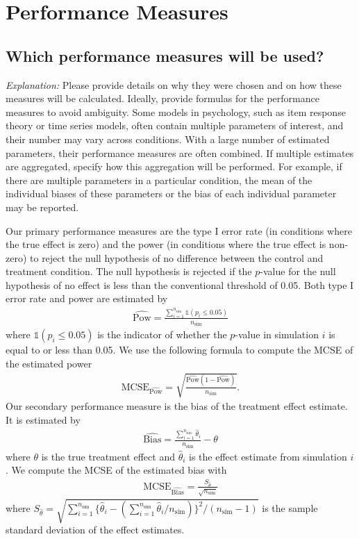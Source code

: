 \documentclass[12pt]{article}
\begin{document}
\section{Performance Measures}
\subsection{Which performance measures will be used?}    
\textit{Explanation:} Please provide details on why they were chosen and on how these measures will be calculated. Ideally, provide formulas for the performance measures to avoid ambiguity. Some models in psychology, such as item response theory or time series models, often contain multiple parameters of interest, and their number may vary across conditions. With a large number of estimated parameters, their performance measures are often combined. If multiple estimates are aggregated, specify how this aggregation will be performed. For example, if there are multiple parameters in a particular condition, the mean of the individual biases of these parameters or the bias of each individual parameter may be reported.  
    
\begin{examplebox}
Our primary performance measures are the type I error rate (in conditions where the true effect is zero) and the power (in conditions where the true effect is non-zero) to reject the null hypothesis of no difference between the control and treatment condition. The null hypothesis is rejected if the $p$-value for the null hypothesis of no effect is less than the conventional threshold of 0.05. Both type I error rate and power are estimated by 
\begin{align*}
   \widehat{\text{Pow}} = \frac{\sum_{i=1}^{n_{\mathrm{sim}}} \mathbb{1}(p_i \leq 0.05)}{n_{\mathrm{sim}}}
\end{align*}
where $\mathbb{1}(p_i \leq 0.05)$ is the indicator of whether the $p$-value in simulation $i$ is equal to or less than 0.05. We use the following formula to compute the MCSE of the estimated power
\begin{align*}
    \text{MCSE}_{\widehat{\text{Pow}}} = \sqrt{\frac{\widehat{\text{Pow}} (1 - \widehat{\text{Pow}})}{n_{\mathrm{sim}}}}.
\end{align*}
Our secondary performance measure is the bias of the treatment effect estimate. It is estimated by 
\begin{align*}
   \widehat{\text{Bias}} = \frac{\sum_{i=1}^{n_{\mathrm{sim}}} \hat{\theta}_i}{n_{\mathrm{sim}}} - \theta
\end{align*}
where $\theta$ is the true treatment effect and $\hat{\theta}_i$ is the effect estimate from simulation $i$. We compute the MCSE of the estimated bias with
\begin{align*}
    \text{MCSE}_{\widehat{\text{Bias}}} = \frac{S_{\hat{\theta}}}{\sqrt{n_{\mathrm{sim}}}}
\end{align*}
where $S_{\hat{\theta}} = \sqrt{\sum_{i=1}^{n_{\mathrm{sim}}} \{\hat{\theta}_i - (\sum_{i=1}^{n_{\mathrm{sim}}}\hat{\theta}_i/n_{\mathrm{sim}})\}^2/(n_{\mathrm{sim}} - 1)}$ is the sample standard deviation of the effect estimates.
\end{examplebox}
\end{document}
